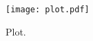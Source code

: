 

\begin{figure}
  \centering
  \texttt{[image: plot.pdf]}
  \caption{Plot.}
  \label{fig:plot}
\end{figure}